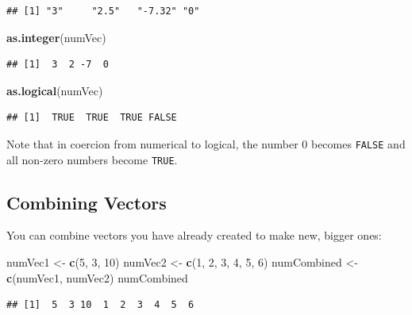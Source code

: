 \documentclass[]{book}
\makeatletter
\newenvironment{Shaded}{\begin{snugshade}}{\end{snugshade}}
\newcommand{\KeywordTok}[1]{\textcolor[rgb]{0.13,0.29,0.53}{\textbf{{#1}}}}
\newcommand{\DecValTok}[1]{\textcolor[rgb]{0.00,0.00,0.81}{{#1}}}
\newcommand{\StringTok}[1]{\textcolor[rgb]{0.31,0.60,0.02}{{#1}}}
\newcommand{\NormalTok}[1]{{#1}}
\newenvironment{kframe}{%
\medskip{}
\setlength{\fboxsep}{.8em}
 \def\at@end@of@kframe{}%
 \ifinner\ifhmode%
  \def\at@end@of@kframe{\end{minipage}}%
  \begin{minipage}{\columnwidth}%
 \fi\fi%
 \def\FrameCommand##1{\hskip\@totalleftmargin \hskip-\fboxsep
 \colorbox{shadecolor}{##1}\hskip-\fboxsep
     \hskip-\linewidth \hskip-\@totalleftmargin \hskip\columnwidth}%
 \MakeFramed {\advance\hsize-\width
   \@totalleftmargin\z@ \linewidth\hsize
   \@setminipage}}%
 {\par\unskip\endMakeFramed%
 \at@end@of@kframe}
\renewenvironment{Shaded}{\begin{kframe}}{\end{kframe}}
\theoremstyle{definition}
\theoremstyle{definition}
\theoremstyle{remark}
\makeatother
\begin{document}
\begin{verbatim}
## [1] "3"     "2.5"   "-7.32" "0"
\end{verbatim}

\begin{Shaded}
\begin{Highlighting}[]
\KeywordTok{as.integer}\NormalTok{(numVec)}
\end{Highlighting}
\end{Shaded}

\begin{verbatim}
## [1]  3  2 -7  0
\end{verbatim}

\begin{Shaded}
\begin{Highlighting}[]
\KeywordTok{as.logical}\NormalTok{(numVec)}
\end{Highlighting}
\end{Shaded}

\begin{verbatim}
## [1]  TRUE  TRUE  TRUE FALSE
\end{verbatim}

Note that in coercion from numerical to logical, the number 0 becomes
\texttt{FALSE} and all non-zero numbers become \texttt{TRUE}.

\subsection{Combining Vectors}\label{combining-vectors}

You can combine vectors you have already created to make new, bigger
ones:

\begin{Shaded}
\begin{Highlighting}[]
\NormalTok{numVec1 <-}\StringTok{ }\KeywordTok{c}\NormalTok{(}\DecValTok{5}\NormalTok{, }\DecValTok{3}\NormalTok{, }\DecValTok{10}\NormalTok{)}
\NormalTok{numVec2 <-}\StringTok{ }\KeywordTok{c}\NormalTok{(}\DecValTok{1}\NormalTok{, }\DecValTok{2}\NormalTok{, }\DecValTok{3}\NormalTok{, }\DecValTok{4}\NormalTok{, }\DecValTok{5}\NormalTok{, }\DecValTok{6}\NormalTok{)}
\NormalTok{numCombined <-}\StringTok{ }\KeywordTok{c}\NormalTok{(numVec1, numVec2)}
\NormalTok{numCombined}
\end{Highlighting}
\end{Shaded}

\begin{verbatim}
## [1]  5  3 10  1  2  3  4  5  6
\end{verbatim}
\end{document}
